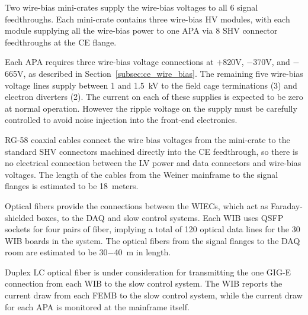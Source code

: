 Two wire-bias mini-crates supply the wire-bias voltages to all 6 signal feedthroughs. Each mini-crate 
contains three wire-bias HV modules, with each module supplying all the wire-bias power to one APA via
8 SHV connector feedthroughs at the CE flange.

Each APA requires three wire-bias voltage connections 
at $+$820V, $-$370V, and $-$665V, as described in Section~\ref{subsec:ce_wire_bias}.
The remaining five wire-bias voltage lines supply between 1 and 1.5~kV to the field cage terminations (3)
and electron diverters (2).
The current on each of these supplies is expected to be zero at normal operation.
However the ripple voltage on the supply must be carefully controlled 
to avoid noise injection into the front-end electronics.

RG-58 coaxial cables connect the wire bias voltages from the mini-crate to the standard SHV
connectors machined directly into the CE feedthrough, so there is no electrical connection between 
the LV power and data connectors and wire-bias voltages. The length of the cables from the Weiner mainframe
to the signal flanges is estimated to be 18~meters.


Optical fibers provide the connections between the WIECs, which act as
Faraday-shielded boxes, to the DAQ and slow control systems.
Each WIB uses QSFP sockets for 
four pairs of fiber, %
implying a total of 120 optical data lines for the 30 WIB boards in the system. The optical fibers from
the signal flanges to the DAQ room are estimated to be 30$-$40~m in length.

Duplex LC optical fiber is under consideration for transmitting the one GIG-E connection from each
WIB to the slow control system. The WIB reports the current draw from each FEMB to the slow control system, while the 
current draw for each APA is monitored at the mainframe itself.


